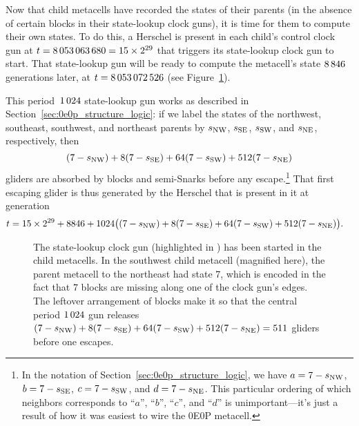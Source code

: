 Now that child metacells have recorded the states of their parents (in the absence of certain blocks in their state-lookup clock guns), it is time for them to compute their own states. To do this, a Herschel is present in each child's control clock gun at $t = 8{\,}053{\,}063{\,}680 = 15 \times 2^{29}$ that triggers its state-lookup clock gun to start. That state-lookup gun will be ready to compute the metacell's state $8{\,}846$ generations later, at $t = 8{\,}053{\,}072{\,}526$ (see Figure~\ref{fig:0e0p_timeline_8053072526}).

This period~$1{\,}024$ state-lookup gun works as described in Section~\ref{sec:0e0p_structure_logic}: if we label the states of the northwest, southeast, southwest, and northeast parents by $s_{\textup{NW}}$, $s_{\textup{SE}}$, $s_{\textup{SW}}$, and $s_{\textup{NE}}$, respectively, then
\[
	(7-s_{\textup{NW}}) + 8(7-s_{\textup{SE}}) + 64(7-s_{\textup{SW}}) + 512(7-s_{\textup{NE}})
\]
gliders are absorbed by blocks and semi-Snarks before any escape.\footnote{In the notation of Section~\ref{sec:0e0p_structure_logic}, we have $a = 7-s_{\textup{NW}}$, $b = 7-s_{\textup{SE}}$, $c = 7-s_{\textup{SW}}$, and $d = 7-s_{\textup{NE}}$. This particular ordering of which neighbors corresponds to ``$a$'', ``$b$'', ``$c$'', and ``$d$'' is unimportant---it's just a result of how it was easiest to wire the 0E0P metacell.} That first escaping glider is thus generated by the Herschel that is present in it at generation
\begin{align*}
	t & = 15 \times 2^{29} + 8846 + 1024\big((7-s_{\textup{NW}}) + 8(7-s_{\textup{SE}}) + 64(7-s_{\textup{SW}}) + 512(7-s_{\textup{NE}})\big).
\end{align*}

\begin{figure}[!htb]
\centering
{}
\caption{The state-lookup clock gun (highlighted in ) has been started in the child metacells. In the southwest child metacell (magnified here), the parent metacell to the northeast had state $7$, which is encoded in the fact that $7$ blocks are missing along one of the clock gun's edges. The leftover arrangement of blocks make it so that the central period $1{\,}024$ gun releases $(7-s_{\textup{NW}}) + 8(7-s_{\textup{SE}}) + 64(7-s_{\textup{SW}}) + 512(7-s_{\textup{NE}}) = 511$ gliders before one escapes.}
\label{fig:0e0p_timeline_8053072526}
\end{figure}


